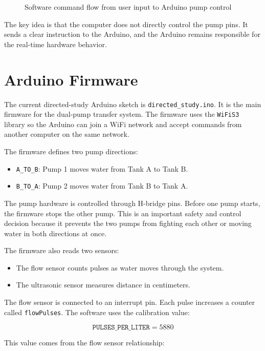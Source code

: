 \begin{figure}[H]
{\begin{tikzpicture}
\end{tikzpicture}%
}
\caption{Software command flow from user input to Arduino pump control}
\label{fig:software-flow}
\end{figure}

The key idea is that the computer does not directly control the pump pins. It sends a clear instruction to the Arduino, and the Arduino remains responsible for the real-time hardware behavior.

\section{Arduino Firmware}

The current directed-study Arduino sketch is \texttt{directed\_study.ino}. It is the main firmware for the dual-pump transfer system. The firmware uses the \texttt{WiFiS3} library so the Arduino can join a WiFi network and accept commands from another computer on the same network.

The firmware defines two pump directions:

\begin{itemize}
    \item \texttt{A\_TO\_B}: Pump 1 moves water from Tank A to Tank B.
    \item \texttt{B\_TO\_A}: Pump 2 moves water from Tank B to Tank A.
\end{itemize}

The pump hardware is controlled through H-bridge pins. Before one pump starts, the firmware stops the other pump. This is an important safety and control decision because it prevents the two pumps from fighting each other or moving water in both directions at once.

The firmware also reads two sensors:

\begin{itemize}
    \item The flow sensor counts pulses as water moves through the system.
    \item The ultrasonic sensor measures distance in centimeters.
\end{itemize}

The flow sensor is connected to an interrupt pin. Each pulse increases a counter called \texttt{flowPulses}. The software uses the calibration value:

\[
\texttt{PULSES\_PER\_LITER} = 5880
\]

This value comes from the flow sensor relationship:

